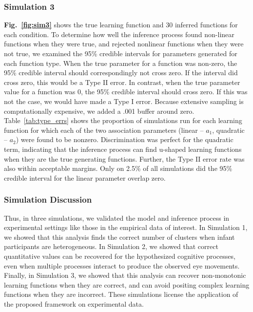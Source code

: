 \documentclass[12pt]{article}
\begin{document}
\subsubsection*{Simulation 3}

	\textbf{Fig.~\ref{fig:sim3}} shows the true learning function and 30 inferred functions for each condition. To determine how well the inference process found non-linear functions when they were true, and rejected nonlinear functions when they were not true, we examined the 95\% credible intervals for parameters generated for each function type. When the true parameter for a function was non-zero, the 95\% credible interval should correspondingly not cross zero. If the interval did cross zero, this would be a Type II error. In contrast, when the true parameter value for a function was 0, the 95\% credible interval should cross zero. If this was not the case, we would have made a Type I error. Because extensive sampling is computationally expensive, we added a .001 buffer around zero. Table~\ref{tab:type_errs} shows the proportion of simulations run for each learning function for which each of the two association parameters (linear -- $a_{1}$, quadratic -- $a_{2}$) were found to be nonzero. Discrimination was perfect for the quadratic term, indicating that the inference process can find u-shaped learning functions when they are the true generating functions. Further, the Type II error rate was also within acceptable margins. Only on 2.5\% of all simulations did the 95\% credible interval for the linear parameter overlap zero. 

\subsubsection*{Simulation Discussion} 

	Thus, in three simulations, we validated the model and inference process in experimental settings like those in the empirical data of interest. In Simulation 1, we showed that this analysis finds the correct number of clusters when infant participants are heterogeneous. In Simulation 2, we showed that correct quantitative values can be recovered for the hypothesized cognitive processes, even when multiple processes interact to produce the observed eye movements. Finally, in Simulation 3, we showed that this analysis can recover non-monotonic learning functions when they are correct, and can avoid positing complex learning functions when they are incorrect. These simulations license the application of the proposed framework on experimental data.
\end{document}
